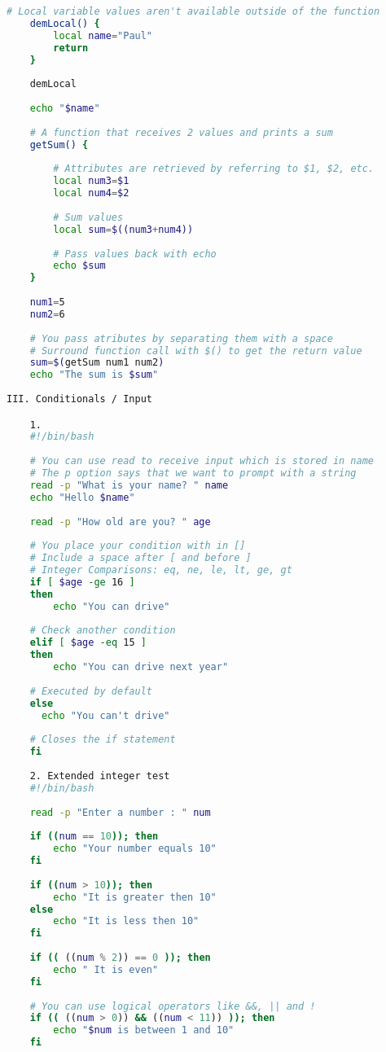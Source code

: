 \begin{lstlisting}[language=bash,caption={basics of bash}]
 	# Local variable values aren't available outside of the function
 	demLocal() {
 		local name="Paul"
 		return
 	}
 	
 	demLocal
 	
 	echo "$name"
 	
 	# A function that receives 2 values and prints a sum
 	getSum() {
 	
 		# Attributes are retrieved by referring to $1, $2, etc.
 		local num3=$1
 		local num4=$2
 		
 		# Sum values
 		local sum=$((num3+num4))
 		
 		# Pass values back with echo
 		echo $sum
 	}
 	
 	num1=5
 	num2=6
 	
 	# You pass atributes by separating them with a space
 	# Surround function call with $() to get the return value
 	sum=$(getSum num1 num2)
 	echo "The sum is $sum"
 	
III. Conditionals / Input 

	1. 
	#!/bin/bash
	
	# You can use read to receive input which is stored in name
	# The p option says that we want to prompt with a string
  	read -p "What is your name? " name
  	echo "Hello $name"
  
  	read -p "How old are you? " age
  	 
  	# You place your condition with in []
  	# Include a space after [ and before ]
  	# Integer Comparisons: eq, ne, le, lt, ge, gt
  	if [ $age -ge 16 ]
  	then
  		echo "You can drive"
  	
  	# Check another condition
  	elif [ $age -eq 15 ]
  	then
  		echo "You can drive next year"
  		
  	# Executed by default
 	else
 	  echo "You can't drive"
 	  
 	# Closes the if statement
 	fi
 	
 	2. Extended integer test
 	#!/bin/bash
 	
 	read -p "Enter a number : " num
 	
 	if ((num == 10)); then
 		echo "Your number equals 10"
 	fi
 	
 	if ((num > 10)); then
 		echo "It is greater then 10"
 	else
 		echo "It is less then 10"
 	fi
 	
 	if (( ((num % 2)) == 0 )); then
 		echo " It is even"
 	fi
 	
 	# You can use logical operators like &&, || and !
 	if (( ((num > 0)) && ((num < 11)) )); then
 		echo "$num is between 1 and 10"
 	fi
 	

\end{lstlisting}
